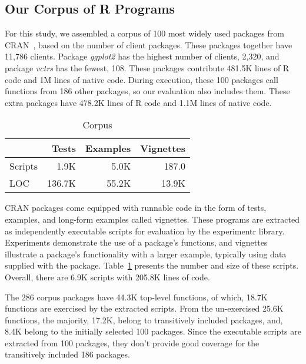 \documentclass[10pt,review,sigplan,anonymous=true,authorversion=true,nonacm=true]{acmart}
\newcommand{\experimentr}{{\sf experimentr}\xspace}
\newcommand{\ggplot}{\textit{ggplot2}\xspace}
\newcommand{\vctrs}{\textit{vctrs}\xspace}
\begin{document}
\subsection{Our Corpus of R Programs}

For this study, we assembled a corpus of 100 most widely used packages from
CRAN~\cite{ligges2017}, based on the number of client packages. These packages
together have 11,786 clients. Package \ggplot has the highest number of clients,
2,320, and package \vctrs has the fewest, 108. These packages contribute 481.5K
lines of R code and 1M lines of native code. During execution, these 100
packages call functions from 186 other packages, so our evaluation also includes
them. These extra packages have 478.2K lines of R code and 1.1M lines of native
code.


\begin{table}[!h]
  \vspace{-3mm}
  \small
  \centering
  \caption{Corpus}\label{table:corpus}
  \vspace{-3mm}
  \begin{tabular}{lrrr}
    \toprule
    &\bf Tests&\bf Examples&\bf Vignettes\\
    \midrule
    {Scripts}&1.9K&5.0K&187.0\\
    \midrule
    {LOC}&136.7K&55.2K&13.9K\\
    \bottomrule
  \end{tabular}
\end{table}

CRAN packages come equipped with runnable code in the form of tests, examples,
and long-form examples called vignettes. These programs are extracted as
independently executable scripts for evaluation by the \experimentr library.
Experiments demonstrate the use of a package's functions, and vignettes
illustrate a package's functionality with a larger example, typically using data
supplied with the package. Table~\ref{table:corpus} presents the number and size
of these scripts. Overall, there are 6.9K scripts with 205.8K lines of code.

The 286 corpus packages have 44.3K top-level functions, of which, 18.7K
functions are exercised by the extracted scripts. From the un-exercised 25.6K
functions, the majority, 17.2K, belong to transitively included packages, and,
8.4K belong to the initially selected 100 packages. Since the executable scripts
are extracted from 100 packages, they don't provide good coverage for the
transitively included 186 packages.
\end{document}
